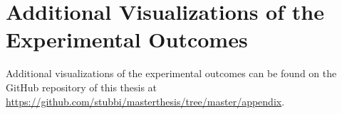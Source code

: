 \documentclass{cukthesis} %
\begin{document}


   








\tableofcontents 

\printglossaries 
\listoffigures 

\listofalgorithms
  
\cleardoublepage
{}












\appendix
\chapter{Additional Visualizations of the Experimental Outcomes}
Additional visualizations of the experimental outcomes can be found on the GitHub repository of this thesis at \url{https://github.com/stubbi/masterthesis/tree/master/appendix}.
\end{document}

